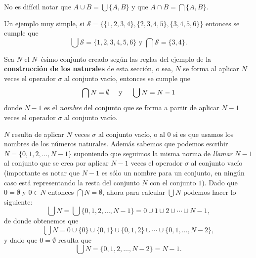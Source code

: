 No es difícil notar que $A\cup B=\bigcup\{A,B\}$ y que $A\cap B=\bigcap\{A,B\}$.

\begin{ejemplo}
Un ejemplo muy simple, si $\mathcal{S}=\{\{1,2,3,4\},\{2,3,4,5\},\{3,4,5,6\}\}$ entonces se cumple que
\[
\bigcup\mathcal{S}=\{1,2,3,4,5,6\}\text{ y }\bigcap\mathcal{S}=\{3,4\}.
\]
\end{ejemplo}

\begin{ejemplo}
Sea $N$ el $N$--ésimo conjunto creado según las reglas del ejemplo de la {\bf construcción de los naturales} de esta sección, o sea, $N$ se forma al aplicar $N$ veces el operador $\sigma$ al conjunto vacío, entonces se cumple que
\[
\bigcap N=\emptyset\text{\hspace*{10pt} y \hspace*{10pt}}\bigcup N=N-1
\]
donde $N-1$ es el \emph{nombre} del conjunto que se forma a partir de aplicar $N-1$ veces el operador $\sigma$ al conjunto vacío.

\begin{demostracion}
$N$ resulta de aplicar $N$ veces $\sigma$ al conjunto vacío, o al 0 si es que usamos los nombres de los números naturales.
Además sabemos que podemos escribir $N=\{0,1,2,\ldots,N-1\}$ suponiendo que seguimos la misma norma de \emph{llamar} $N-1$ al conjunto que se crea por aplicar $N-1$ veces el operador $\sigma$ al conjunto vacío (importante es notar que $N-1$ es sólo un nombre para un conjunto, en ningún caso está representando la resta del conjunto $N$ con el conjunto $1$).
Dado que $0=\emptyset$ y $0\in N$ entonces $\bigcap N=\emptyset$, ahora para calcular $\bigcup N$ podemos hacer lo siguiente:
\[
\bigcup N=\bigcup\{0,1,2,\ldots,N-1\}=0\cup 1\cup 2\cup\cdots\cup N-1,
\]
de donde obtenemos que
\[
\bigcup N=0\cup\{0\}\cup\{0,1\}\cup\{0,1,2\}\cup\cdots\cup\{0,1,\ldots,N-2\},
\]
y dado que $0=\emptyset$ resulta que
\[
\bigcup N=\{0,1,2,\ldots,N-2\}=N-1.
\]
\end{demostracion}
\end{ejemplo}

